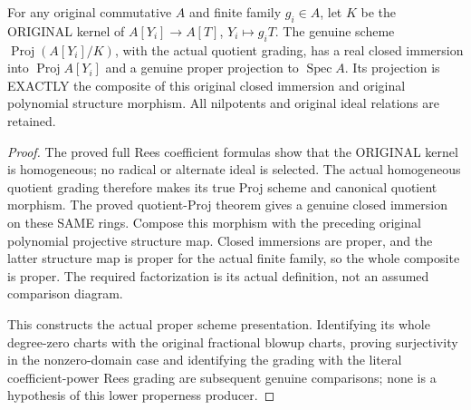 \begin{theorem}
\label{scheme:actual-rees-presentation-proper}
\leanok
{}
For any original commutative $A$ and finite family $g_i\in A$, let
$K$ be the ORIGINAL kernel of $A[Y_i]\to A[T]$, $Y_i\mapsto g_iT$.
The genuine scheme
$\operatorname{Proj}(A[Y_i]/K)$, with the actual quotient grading,
has a real closed immersion into $\operatorname{Proj}A[Y_i]$ and a genuine
proper projection to $\operatorname{Spec}A$. Its projection is EXACTLY the
composite of this original closed immersion and original polynomial
structure morphism. All nilpotents and original ideal relations are retained.
\end{theorem}
\begin{proof}
The proved full Rees coefficient formulas show that the ORIGINAL kernel is
homogeneous; no radical or alternate ideal is selected. The actual homogeneous
quotient grading therefore makes its true Proj scheme and canonical quotient
morphism. The proved quotient-Proj theorem gives a genuine closed immersion
on these SAME rings. Compose this morphism with the preceding original
polynomial projective structure map. Closed immersions are proper, and the
latter structure map is proper for the actual finite family, so the whole
composite is proper. The required factorization is its actual definition,
not an assumed comparison diagram.

This constructs the actual proper scheme presentation. Identifying its
whole degree-zero charts with the original fractional blowup charts, proving
surjectivity in the nonzero-domain case and identifying the grading with the
literal coefficient-power Rees grading are subsequent genuine comparisons;
none is a hypothesis of this lower properness producer.
\end{proof}
